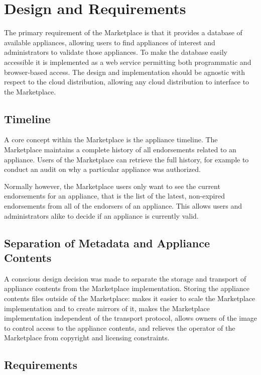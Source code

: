 \section{Design and Requirements}
\label{sec:design}

The primary requirement of the Marketplace is that it provides a
database of available appliances, allowing users to find appliances of
interest and administrators to validate those appliances.  To make the
database easily accessible it is implemented as a web service permitting
both programmatic and browser-based access.  The design and
implementation should be agnostic with respect to the cloud
distribution, allowing any cloud distribution to interface to the
Marketplace\@.

\subsection{Timeline}

A core concept within the Marketplace is the appliance timeline.  The
Marketplace maintains a complete history of all endorsements related
to an appliance.  Users of the Marketplace can retrieve the full history,
for example to conduct an audit on why a particular appliance was
authorized.

Normally however, the Marketplace users only want to see the current
endorsements for an appliance, that is the list of the latest,
non-expired endorsements from all of the endorsers of an appliance.  This
allows users and administrators alike to decide if an appliance is
currently valid.

\subsection{Separation of Metadata and Appliance Contents}

A conscious design decision was made to separate the storage and
transport of appliance contents from the Marketplace implementation.
Storing the appliance contents files outside of the Marketplace: makes
it easier to scale the Marketplace implementation and to create
mirrors of it, makes the Marketplace implementation independent of the
transport protocol, allows owners of the image to control access to
the appliance contents, and relieves the operator of the Marketplace
from copyright and licensing constraints.

\subsection{Requirements}

